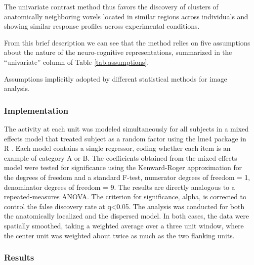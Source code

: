 The univariate contrast method thus favors the discovery of clusters of anatomically neighboring voxels located in similar regions across individuals and showing similar response profiles across experimental conditions. 

From this brief description we can see that the method relies on five assumptions about the nature of the neuro-cognitive representations, summarized in the ``univariate'' column of Table \ref{tab.assumptions}.


\begin{sidewaystable*}[ph!]
	
	\caption{Assumptions implicitly adopted by different statistical methods for image analysis.}
	\label{tab.assumptions}
\end{sidewaystable*}

\subsubsection{Implementation}
The activity at each unit was modeled simultaneously for all subjects in a mixed effects model that treated subject as a random factor \cite{chen_linear_2013, friston_mixed-effects_2005} using the lme4 package in R \cite{bates_linear_2013}. Each model contains a single regressor, coding whether each item is an example of category A or B. The coefficients obtained from the mixed effects model were tested for significance using the Kenward-Roger approximation for the degrees of freedom \cite{kenward_small_1997} and a standard F-test, numerator degrees of freedom = 1, denominator degrees of freedom = 9. The results are directly analogous to a repeated-measures ANOVA. The criterion for significance, alpha, is corrected to control the false discovery rate at q<0.05. The analysis was conducted for both the anatomically localized and the dispersed model. In both cases, the data were spatially smoothed, taking a weighted average over a three unit window, where the center unit was weighted about twice as much as the two flanking units.

\subsubsection{Results} 


